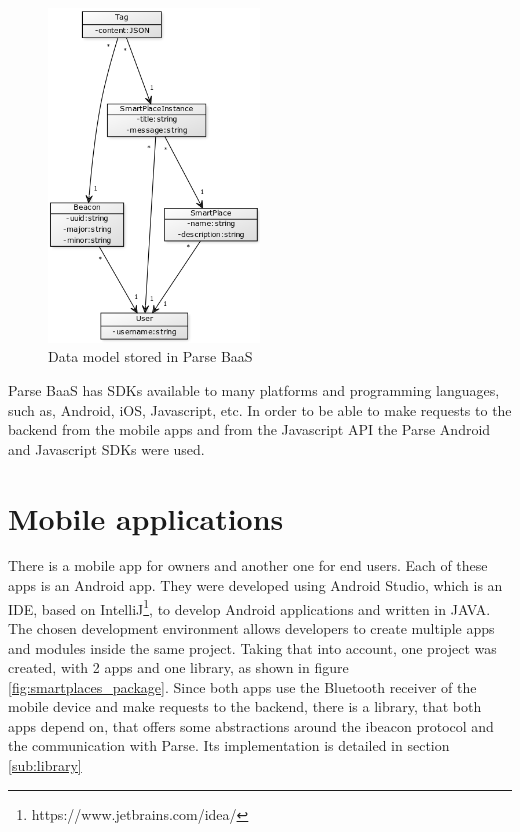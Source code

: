 \begin{figure}[!ht]
  \centering
    \includegraphics[width=0.5\textwidth]{images/backend_data_model}
    \caption{Data model stored in Parse \gls{BaaS}}
    \label{fig:backend_data_model}
\end{figure}

Parse \gls{BaaS} has \glspl{SDK} available to many platforms and programming
languages, such as, Android, iOS, Javascript, etc.
In order to be able to make requests to the backend from the mobile apps and
from the Javascript API
the Parse Android and Javascript \glspl{SDK} were used.

\section{Mobile applications}
\label{sec:mobile_applications}
There is a mobile app for owners and another one for end users.
Each of these apps is an Android app. They were developed using Android
Studio, which is an \gls{IDE}, based on
IntelliJ\footnote{https://www.jetbrains.com/idea/},
to develop Android
applications and written in JAVA.
The chosen development environment allows developers to create multiple
apps and modules inside the same project.
Taking that into account,
one project was created, with 2 apps and one library, as shown in figure
\ref{fig:smartplaces_package}. Since both apps use the Bluetooth receiver
of the mobile device and make requests to the backend, there is a library,
that both apps depend on, that offers some abstractions around the ibeacon
protocol and the communication with Parse.
Its implementation is detailed in section \ref{sub:library}

